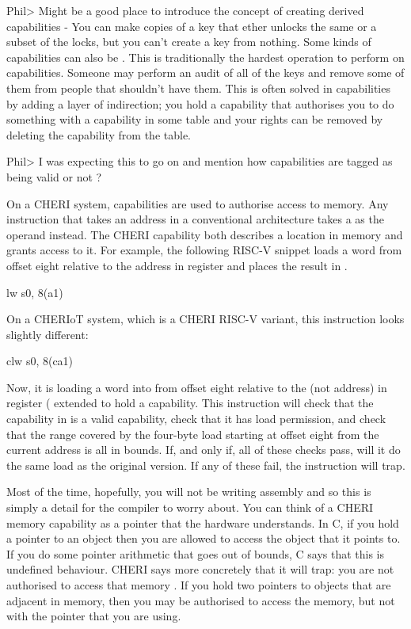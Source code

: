 Phil> Might be a good place to introduce the concept of creating derived capabilities - You can make copies of a key that ether unlocks the same or a subset of the locks, but you can't create a key from nothing. 
Some kinds of capabilities can also be .
This is traditionally the hardest operation to perform on capabilities.
Someone may perform an audit of all of the keys and remove some of them from people that shouldn't have them.
This is often solved in capabilities by adding a layer of indirection; you hold a capability that authorises you to do something with a capability in some table and your rights can be removed by deleting the capability from the table.

Phil> I was expecting this to go on and mention how capabilities are tagged as being valid or not ?

On a CHERI system, capabilities are used to authorise access to memory.
Any instruction that takes an address in a conventional architecture takes a  as the operand instead.
The CHERI capability both describes a location in memory and grants access to it.
For example, the following RISC-V snippet loads a word from offset eight relative to the address in register  and places the result in .

\begin{asmsnippet}
	lw	s0, 8(a1)
\end{asmsnippet}

On a CHERIoT system, which is a CHERI RISC-V variant, this instruction looks slightly different:

\begin{asmsnippet}
	clw	s0, 8(ca1)
\end{asmsnippet}

Now, it is loading a word into  from offset eight relative to the  (not address) in register  ( extended to hold a capability.
This instruction will check that the capability in  is a valid capability, check that it has load permission, and check that the range covered by the four-byte load starting at offset eight from the current address is all in bounds.
If, and only if, all of these checks pass, will it do the same load as the original version.
If any of these fail, the instruction will trap.


Most of the time, hopefully, you will not be writing assembly and so this is simply a detail for the compiler to worry about.
You can think of a CHERI memory capability as a pointer that the hardware understands.
In C, if you hold a pointer to an object then you are allowed to access the object that it points to.
If you do some pointer arithmetic that goes out of bounds, C says that this is undefined behaviour.
CHERI says more concretely that it will trap: you are not authorised to access that memory .
If you hold two pointers to objects that are adjacent in memory, then you may be authorised to access the memory, but not with the pointer that you are using.

